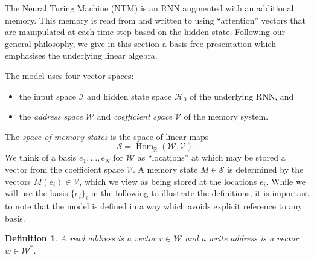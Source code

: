 \documentclass[english,letter paper,12pt,leqno]{article}
\theoremstyle{example}
\newtheorem{definition}[theorem]{Definition}
\numberwithin{equation}{section}
\def\Hom{\operatorname{Hom}}
\begin{document}
The Neural Turing Machine (NTM) \cite{ntm} is an RNN augmented with an additional memory. This memory is read from and written to using ``attention'' vectors that are manipulated at each time step based on the hidden state. Following our general philosophy, we give in this section a basis-free presentation which emphasises the underlying linear algebra. 

The model uses four vector spaces:
\begin{itemize}
\item the input space $\mathscr{I}$ and hidden state space $\mathscr{H}_0$ of the underlying RNN, and
\item the \emph{address space} $\mathscr{W}$ and \emph{coefficient space} $\mathscr{V}$ of the memory system.
\end{itemize}
The \emph{space of memory states} is the space of linear maps
\[
\mathscr{S} = \Hom_{\mathbb{R}}(\mathscr{W}, \mathscr{V})\,.
\]
We think of a basis $e_1,\ldots,e_N$ for $\mathscr{W}$ as ``locations'' at which may be stored a vector from the coefficient space $\mathscr{V}$. A memory state $M \in \mathscr{S}$ is determined by the vectors $M(e_i) \in \mathscr{V}$, which we view as being stored at the locations $e_i$. While we will use the basis $\{ e_i \}_i$ in the following to illustrate the definitions, it is important to note that the model is defined in a way which avoids explicit reference to any basis.%


\begin{definition} A \emph{read address} is a vector $r \in \mathscr{W}$ and a \emph{write address} is a vector $w \in \mathscr{W}^*$.
\end{definition}
\end{document}

